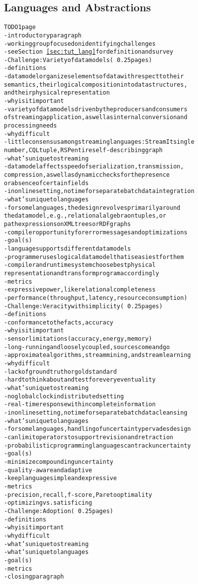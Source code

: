 \subsection{Languages and Abstractions}\label{sec:wg_lang}

\begin{alltt}TODO\scriptsize 1 page
- introductory paragraph
  - working group focused on identifying challenges
  - see Section~\ref{sec:tut_lang} for definition and survey
- Challenge: Variety of data models (~0.25 pages)
  - definitions
    - data model organizes elements of data with respect to their
      semantics, their logical composition into data structures,
      and their physical representation
  - why is it important
    - variety of data models driven by the producers and consumers
      of streaming application, as well as internal conversion and
      processing needs
  - why difficult
    - little consensus among streaming languages: StreamIt single
      number, CQL tuple, RSP entire self-describing graph
  - what's unique to streaming
    - data model affects speed of serialization, transmission,
      compression, as well as dynamic checks for the presence
      or absence of certain fields
    - in online setting, no time for separate batch data integration
  - what's unique to languages
    - for some languages, the design revolves primarily around
      the data model, e.g., relational algebra on tuples, or
      path expressions on XML trees or RDF graphs
    - compiler opportunity for error messages and optimizations
  - goal(s)
    - language supports different data models
    - programmer uses logical data model that is easiest for them
    - compiler and runtime system choose best physical
      representation and transform program accordingly
  - metrics
    - expressive power, like relational completeness
    - performance (throughput, latency, resource consumption)
- Challenge: Veracity with simplicity (~0.25 pages)
  - definitions
    - conformance to the facts, accuracy
  - why is it important
    - sensor limitations (accuracy, energy, memory)
    - long-running and loosely coupled, sources come and go
    - approximate algorithms, stream mining, and stream learning
  - why difficult
    - lack of ground truth or gold standard
    - hard to think about and test for every eventuality
  - what's unique to streaming
    - no global clock in distributed setting
    - real-time response with incomplete information
    - in online setting, no time for separate batch data cleansing
  - what's unique to languages
    - for some languages, handling of uncertainty pervades design
    - can limit operators to support revision and retraction
    - probabilistic programming languages can track uncertainty
  - goal(s)
    - minimize compounding uncertainty
    - quality-aware and adaptive
    - keep language simple and expressive
  - metrics
    - precision, recall, f-score, Pareto optimality
    - optimizing vs. satisficing
- Challenge: Adoption (~0.25 pages)
  - definitions
  - why is it important
  - why difficult
  - what's unique to streaming
  - what's unique to languages
  - goal(s)
  - metrics
- closing paragraph
\end{alltt}
